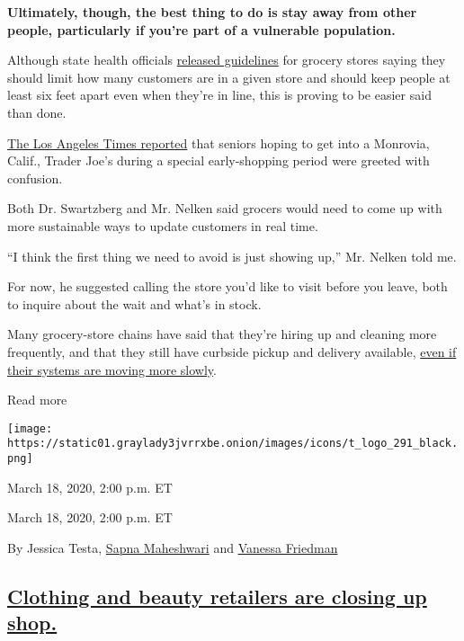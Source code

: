 \textbf{Ultimately, though, the best thing to do is stay away from other
people, particularly if you're part of a vulnerable population.}

Although state health officials
\href{https://www.cdph.ca.gov/Programs/CID/DCDC/Pages/Guidance.aspx}{released
guidelines} for grocery stores saying they should limit how many
customers are in a given store and should keep people at least six feet
apart even when they're in line, this is proving to be easier said than
done.

\href{https://www.latimes.com/california/story/2020-03-17/trader-joes-senior-shopping}{The
Los Angeles Times reported} that seniors hoping to get into a Monrovia,
Calif., Trader Joe's during a special early-shopping period were greeted
with confusion.

Both Dr. Swartzberg and Mr. Nelken said grocers would need to come up
with more sustainable ways to update customers in real time.

``I think the first thing we need to avoid is just showing up,'' Mr.
Nelken told me.

For now, he suggested calling the store you'd like to visit before you
leave, both to inquire about the wait and what's in stock.

Many grocery-store chains have said that they're hiring up and cleaning
more frequently, and that they still have curbside pickup and delivery
available,
\href{https://www.sandiegouniontribune.com/business/retail/story/2020-03-16/online-grocery-delivery-grinds-to-a-halt-due-to-high-demand-in-san-diego-county}{even
if their systems are moving more slowly}.

Read more

\texttt{[image: https://static01.graylady3jvrrxbe.onion/images/icons/t\_logo\_291\_black.png]}

March 18, 2020, 2:00 p.m. ET

March 18, 2020, 2:00 p.m. ET

By Jessica Testa,
\href{https://www.nytimes3xbfgragh.onion/by/sapna-maheshwari}{Sapna
Maheshwari} and
\href{https://www.nytimes3xbfgragh.onion/by/vanessa-friedman}{Vanessa
Friedman}

\hypertarget{clothing-and-beauty-retailers-are-closing-up-shop}{%
\subsection{\texorpdfstring{\protect\hyperlink{clothing-and-beauty-retailers-are-closing-up-shop}{Clothing
and beauty retailers are closing up
shop.}}{Clothing and beauty retailers are closing up shop.}}\label{clothing-and-beauty-retailers-are-closing-up-shop}}

